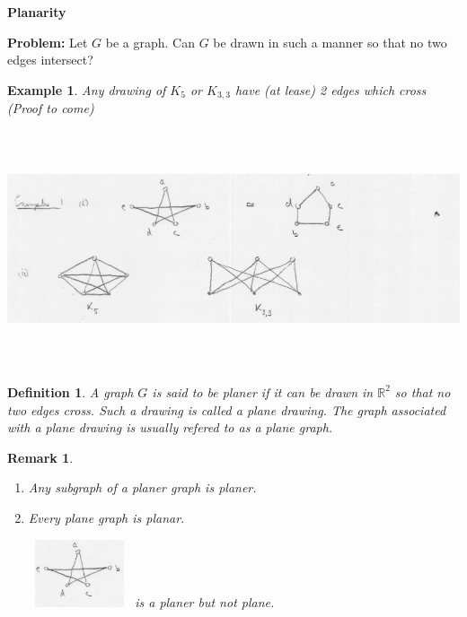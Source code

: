 \documentclass[12pt]{article}
\newtheorem{example}{Example}
\newtheorem{definition}{Definition}
\newtheorem*{remark}{Remark}
\begin{document}
\textbf{Planarity}

\textbf{Problem:} Let $G$ be a graph. Can $G$ be drawn in such a manner so that no two edges intersect?


\begin{example}

	Any drawing of $K_{5}$ or $K_{3,3}$ have (at lease) 2 edges which cross (Proof to come)
	\begin{center}
		\includegraphics[width=15cm,height=7cm]{example1}
	\end{center}
\end{example}


\begin{definition}
	A graph $G$ is said to be planer if it can be drawn in $\mathbb{R}^{2}$ so that no two edges cross. Such a drawing is called a plane drawing. The graph associated with a plane drawing is usually refered to as a plane graph.
\end{definition}

\begin{remark}

	\begin{enumerate}
		\item Any subgraph of a planer graph is planer.
		\item Every plane graph is planar.


		      \includegraphics[width=3cm, height=2cm]{notplane}
		      is a planer but not plane.
	\end{enumerate}

\end{remark}
\end{document}
